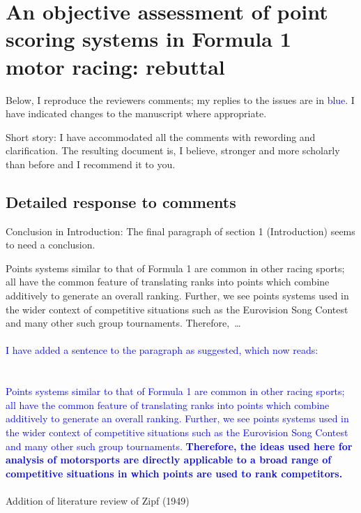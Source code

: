 \documentclass[12pt]{article}
\begin{document}
\section*{An objective assessment of point scoring systems in Formula 1 motor racing: rebuttal}


Below, I reproduce the reviewers comments; my replies to the issues
are in \textcolor{blue}{blue}.  I have indicated changes to the
manuscript where appropriate.

Short story: I have accommodated all the comments with rewording and
clarification.  The resulting document is, I believe, stronger and
more scholarly than before and I recommend it to you.


\subsection*{Detailed response to comments}

Conclusion in Introduction: The final paragraph of section 1
(Introduction) seems to need a conclusion.

Points systems similar to that of Formula 1 are common in other racing
sports; all have the common feature of translating ranks into points
which combine additively to generate an overall ranking.  Further, we
see points systems used in the wider context of competitive situations
such as the Eurovision Song Contest and many other such group
tournaments.  \mbox{Therefore, \ldots}\\ \\

\textcolor{blue}{\noindent I have added a sentence to the paragraph as
  suggested, which now reads:\\ \\ \\Points systems similar to that of
  Formula 1 are common in other racing sports; all have the common
  feature of translating ranks into points which combine additively to
  generate an overall ranking. Further, we see points systems used in
  the wider context of competitive situations such as the Eurovision
  Song Contest and many other such group tournaments.  {\bf Therefore,
    the ideas used here for analysis of motorsports are directly
    applicable to a broad range of competitive situations in which
    points are used to rank competitors.}}\\ \\

Addition of literature review of Zipf (1949)
\end{document}
